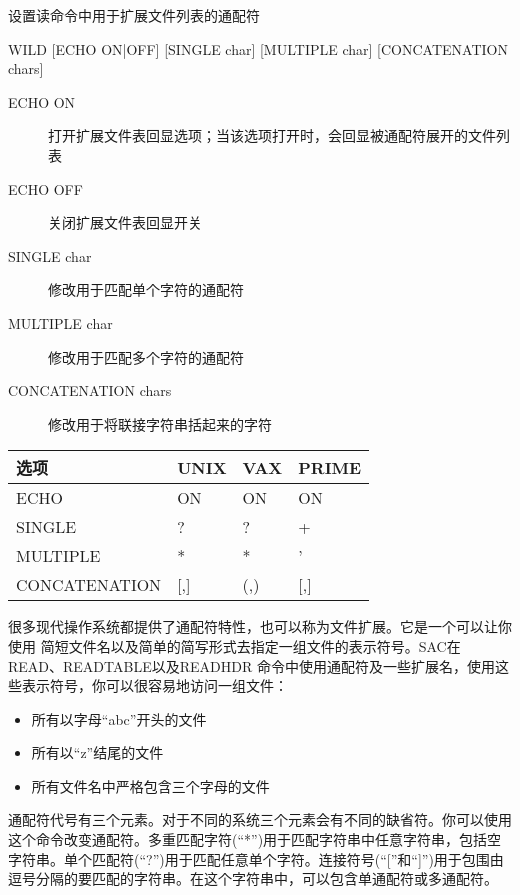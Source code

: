 \label{cmd:wild}

设置读命令中用于扩展文件列表的通配符

\begin{SACSTX}
WILD [ECHO ON|OFF] [SINGLE char] [MULTIPLE char] [CONCATENATION chars]
\end{SACSTX}

\begin{description}
\item [ECHO ON] 打开扩展文件表回显选项；当该选项打开时，会回显被通配符展开的文件列表
\item [ECHO OFF] 关闭扩展文件表回显开关
\item [SINGLE char] 修改用于匹配单个字符的通配符
\item [MULTIPLE char] 修改用于匹配多个字符的通配符 
\item [CONCATENATION chars] 修改用于将联接字符串括起来的字符
\end{description}

\begin{center}
\begin{tabular}{llll}
\toprule
选项	&	UNIX	&	VAX		&	PRIME	\\
\midrule
ECHO	&	ON 		&	ON 		&	ON		\\
SINGLE  &	?  		&	?  		&	+		\\
MULTIPLE&	* 		&	* 		&	'		\\
CONCATENATION& [,] & 	(,)  	&	[,]		\\
\bottomrule
\end{tabular}
\end{center}

很多现代操作系统都提供了通配符特性，也可以称为文件扩展。它是一个可以让你使用
简短文件名以及简单的简写形式去指定一组文件的表示符号。SAC在READ、READTABLE以及READHDR
命令中使用通配符及一些扩展名，使用这些表示符号，你可以很容易地访问一组文件：
\begin{itemize}
\item 所有以字母``abc''开头的文件
\item 所有以``z''结尾的文件
\item 所有文件名中严格包含三个字母的文件
\end{itemize}

通配符代号有三个元素。对于不同的系统三个元素会有不同的缺省符。你可以使用这个命令改变通配符。多重匹配字符(``*'')用于匹配字符串中任意字符串，包括空字符串。单个匹配符(``?'')用于匹配任意单个字符。连接符号(``[''和``]'')用于包围由逗号分隔的要匹配的字符串。在这个字符串中，可以包含单通配符或多通配符。

